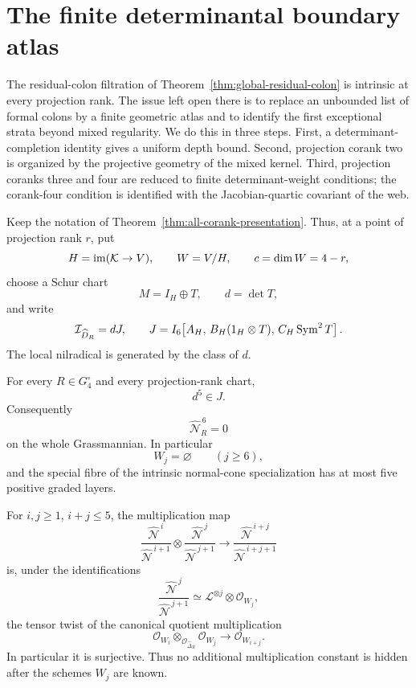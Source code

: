 \section{The finite determinantal boundary atlas}
\label{sec:boundary-atlas-statement}

The residual-colon filtration of
Theorem~\ref{thm:global-residual-colon} is intrinsic at every
projection rank.  The issue left open there is to replace an
unbounded list of formal colons by a finite geometric atlas and to
identify the first exceptional strata beyond mixed regularity.  We do
this in three steps.  First, a determinant-completion identity gives a
uniform depth bound.  Second, projection corank two is organized by
the projective geometry of the mixed kernel.  Third, projection
coranks three and four are reduced to finite determinant-weight
conditions; the corank-four condition is identified with the
Jacobian-quartic covariant of the web.

Keep the notation of
Theorem~\ref{thm:all-corank-presentation}.  Thus, at a point of
projection rank \(r\), put
\[
 H=\operatorname{im}(\mathcal K\to V),\qquad W=V/H,\qquad c=\dim W=4-r,
\]
choose a Schur chart
\[
 M=I_H\oplus T,\qquad d=\det T,
\]
and write
\begin{equation}\label{eq:atlas-residual-J}
 \mathcal I_{\widehat D_R}=dJ,\qquad
 J=I_6\!\left[
 A_H,\,
 B_H(1_H\otimes T),\,
 C_H\operatorname{Sym}^2T
 \right].
\end{equation}
The local nilradical is generated by the class of \(d\).

\begin{theorem}
\label{thm:finite-all-corank-depth}
For every \(R\in G_4^\circ\) and every projection-rank chart,
\begin{equation}\label{eq:d5-in-J}
 d^5\in J.
\end{equation}
Consequently
\[
 \widehat{\mathcal N}_R^{\,6}=0
\]
on the whole Grassmannian.  In particular
\[
 W_j=\varnothing\qquad(j\ge6),
\]
and the special fibre of the intrinsic normal-cone specialization has
at most five positive graded layers.

For \(i,j\ge1\), \(i+j\le5\), the multiplication map
\[
 \frac{\widehat{\mathcal N}^{\,i}}
      {\widehat{\mathcal N}^{\,i+1}}
 \otimes
 \frac{\widehat{\mathcal N}^{\,j}}
      {\widehat{\mathcal N}^{\,j+1}}
 \longrightarrow
 \frac{\widehat{\mathcal N}^{\,i+j}}
      {\widehat{\mathcal N}^{\,i+j+1}}
\]
is, under the identifications
\[
 \frac{\widehat{\mathcal N}^{\,j}}
      {\widehat{\mathcal N}^{\,j+1}}
 \simeq
 \mathcal L^{\otimes j}\otimes\mathcal O_{W_j},
\]
the tensor twist of the canonical quotient multiplication
\begin{equation}\label{eq:atlas-multiplication}
 \mathcal O_{W_i}\otimes_{\mathcal O_{\widehat\Delta_R}}
 \mathcal O_{W_j}
 \longrightarrow
 \mathcal O_{W_{i+j}}.
\end{equation}
In particular it is surjective.  Thus no additional multiplication
constant is hidden after the schemes \(W_j\) are known.
\end{theorem}

